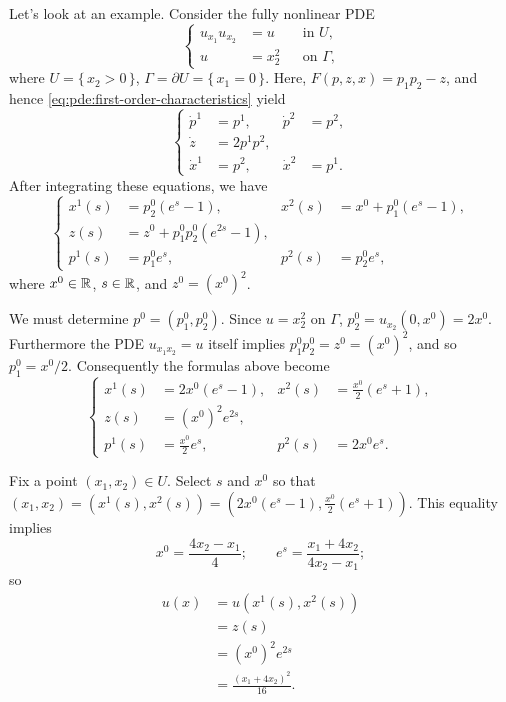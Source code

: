 \begin{example}
  Let's look at an example. Consider the fully nonlinear PDE
  \[
    \tag{\(*\)}
    \left\{
      \begin{aligned}
        u_{x_1}u_{x_2}&=u&&\text{in \(U\),}\\
        u&=x_2^2&&\text{on \(\Gamma\),}
      \end{aligned}
    \right.
  \]
  where \(U=\{\,x_2>0\,\}\), \(\Gamma=\partial U=\{\,x_1=0\,\}\). Here,
  \(F(p,z,x)=p_1p_2-z\), and hence
  \eqref{eq:pde:first-order-characteristics} yield
  \[
    \left\{
      \begin{aligned}
        \dot p^1&=p^1,&\dot p^2&=p^2,\\
        \dot z&=2p^1p^2,\\
        \dot x^1&=p^2,&\dot x^2&=p^1.
      \end{aligned}
    \right.
  \]
After integrating these equations, we have
\[
  \left\{
    \begin{aligned}
      x^1(s)&=p_2^0(e^s-1),&x^2(s)&=x^0+p_1^0(e^s-1),\\
      z(s)&=z^0+p_1^0p_2^0(e^{2s}-1),\\
      p^1(s)&=p_1^0e^s,&p^2(s)&=p_2^0e^s,
    \end{aligned}
  \right.
\]
where \(x^0\in\mathbb{R}\), \(s\in\mathbb{R}\), and \(z^0={(x^0)}^2\).

We must determine \(p^0=(p_1^0,p_2^0)\). Since \(u=x_2^2\) on \(\Gamma\),
\(p_2^0=u_{x_2}(0,x^0)=2x^0\). Furthermore the PDE \(u_{x_1x_2}=u\) itself
implies \(p_1^0p_2^0=z^0={(x^0)}^2\), and so \(p_1^0=x^0/2\). Consequently
the formulas above become
\[
  \left\{
    \begin{aligned}
      x^1(s)&=2x^0(e^s-1),&x^2(s)&=\frac{x^0}{2}(e^s+1),\\
      z(s)&={(x^0)}^{2}e^{2s},\\
      p^1(s)&=\frac{x^0}{2}e^s,&p^2(s)&=2x^0e^s.
    \end{aligned}
  \right.
\]

Fix a point \((x_1,x_2)\in U\). Select \(s\) and \(x^0\) so that
\((x_1,x_2)=(x^1(s),x^2(s))=(2x^0(e^s-1),\frac{x^0}{2}(e^s+1))\). This
equality implies
\[
  x^0=\frac{4x_2-x_1}{4};\qquad e^s=\frac{x_1+4x_2}{4x_2-x_1};
\]
so
\begin{align*}
  u(x)
  &=u(x^1(s),x^2(s))\\
  &=z(s)\\
  &={(x^0)}^2e^{2s}\\
  &=\frac{(x_1+4x_2)^2}{16}.
\end{align*}
\end{example}

